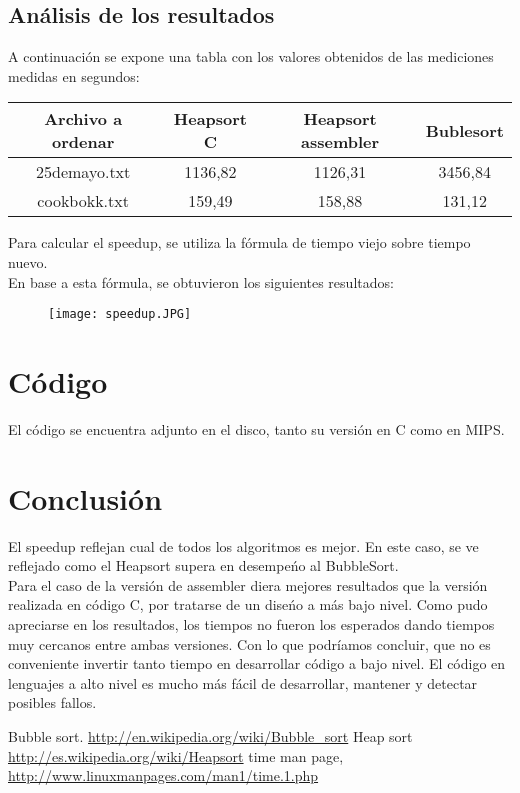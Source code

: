 \documentclass[a4paper,11pt]{article}
\begin{document}
\subsection {An\'alisis de los resultados}

A continuaci\'on se expone una tabla con los valores obtenidos de las mediciones medidas en segundos:

\begin{table}[h]
\begin{tabular}{|c|c|c|c|} \hline
Archivo a ordenar & Heapsort C & Heapsort assembler & Bublesort \\ \hline
25demayo.txt & 1136,82 & 1126,31 & 3456,84\\ \hline
cookbokk.txt & 159,49 & 158,88 & 131,12\\ \hline
\end{tabular}
\end{table}

Para calcular el speedup, se utiliza la f\'ormula de tiempo viejo sobre tiempo nuevo. \\
En base a esta f\'ormula, se obtuvieron los siguientes resultados:

\begin{figure}[h]
\centering
\texttt{[image: speedup.JPG]}
\end{figure}


\section{C\'odigo}

El c\'odigo se encuentra adjunto en el disco, tanto su versi\'on en C como en MIPS.


\newpage

\section{Conclusi\'on}
El speedup reflejan cual de todos los algoritmos es mejor. En este caso, se ve reflejado como el Heapsort supera en desempe\'no al BubbleSort.\\
Para el caso de la versi\'on de assembler diera mejores resultados que la versi\'on realizada en c\'odigo C, por tratarse de un dise\'no a m\'as bajo nivel. Como pudo apreciarse en los resultados, los tiempos no fueron los esperados dando tiempos muy cercanos entre ambas versiones. Con lo que podr\'iamos concluir, que no es conveniente invertir tanto tiempo en desarrollar c\'odigo a bajo nivel. El c\'odigo en lenguajes a alto nivel es mucho m\'as f\'acil de desarrollar, mantener y detectar posibles fallos.

\newpage
\begin{thebibliography}{5}
 Bubble sort. \url{http://en.wikipedia.org/wiki/Bubble_sort}
 Heap sort \url{http://es.wikipedia.org/wiki/Heapsort}
 time man page, \url{http://www.linuxmanpages.com/man1/time.1.php}
\end{thebibliography}
\end{document}
